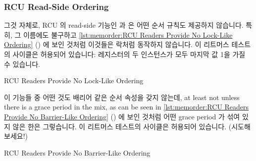 \fi

\subsubsection{RCU Read-Side Ordering}
\label{sec:memorder:RCU Read-Side Ordering}

그것 자체로, RCU 의 read-side 기능인  과
 은 어떤 순서 규칙도 제공하지 않습니다.
특히, 그 이름에도 불구하고
\cref{lst:memorder:RCU Readers Provide No Lock-Like Ordering}
() 에 보인 것처럼 이것들은 락처럼
동작하지 않습니다.
이 리트머스 테스트의 사이클은 허용되어 있습니다:  레지스터의 두
인스턴스가 모두 마지막 값 1을 가질 수 있습니다.

\begin{listing}[tbp]

\caption{RCU Readers Provide No Lock-Like Ordering}
\label{lst:memorder:RCU Readers Provide No Lock-Like Ordering}
\end{listing}

이 기능들 중 어떤 것도 배리어 같은 순서 속성을 갖지 않는데,
at least not unless there is a grace period in the mix, as can be seen in
\cref{lst:memorder:RCU Readers Provide No Barrier-Like Ordering}
() 에 보인 것처럼 어떤 grace period 가
섞여 있지 않은 한은 그렇습니다.
이 리트머스 테스트의 사이클은 허용되어 있습니다.
(시도해 보세요!)

\begin{listing}[tbp]

\caption{RCU Readers Provide No Barrier-Like Ordering}
\label{lst:memorder:RCU Readers Provide No Barrier-Like Ordering}
\end{listing}

